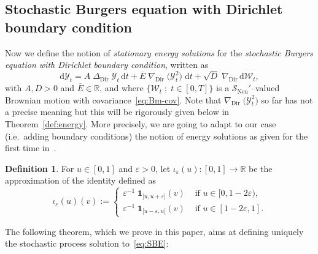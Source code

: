 \documentclass[10pt]{amsart}
\theoremstyle{definition}\newtheorem{defi}[theo]{Definition}\newtheorem{rema}[theo]{Remark}\newtheorem{exam}[theo]{Example}\newtheorem{exem}[theo]{Example}\newtheorem{nota}[theo]{Notation}
\DeclareMathOperator{\Dir}{Dir}
\DeclareMathOperator{\Neu}{Neu}
\newcommand{\bb}[1]{{\mathbb #1}}
\newcommand{\mc}[1]{{\mathcal #1}}
\renewcommand{\mc}[1]{{\mathcal #1}}
\newcommand{\SN}{\ensuremath{\mc S_{\Neu}}}
\renewcommand{\bar}{\overline}
\newcommand*{\dd}{\mathrm{d}}
\newcommand*{\dt}{\dd t}
\begin{document}
\subsection{Stochastic Burgers equation with Dirichlet boundary condition} \label{ssec:SBE}
Now we define the notion of \emph{stationary energy solutions} for the \emph{stochastic Burgers equation with Dirichlet boundary condition}, written as
\begin{equation}\label{eq:SBE}
\dd\mathcal Y_t = A \; \Delta_{\Dir}\; \mathcal Y_t\,\dt + \bar E\;\nabla_{\Dir}\; \big(\mathcal{Y}_t^2 \big) \;\dt + \sqrt{D}\; \nabla_{\Dir}\,\dd\mc W_t,
\end{equation}
with $A,D > 0$ and $\bar E \in \bb R$, and where $\{\mc W_t\; ; \; t\in[0,T]\}$ is a $\SN'$--valued Brownian motion with covariance~\eqref{eq:Bm-cov}. Note that $\nabla_{\Dir}\; \big(\mathcal{Y}_t^2 \big)$ so far has not a precise meaning but this will be rigorously given below in Theorem~\ref{def:energy}. More precisely, we are going to adapt to our case (i.e.~adding boundary conditions) the notion of energy solutions as given for the first time in~\cite{gj2014, Gubinelli2013}.

\begin{defi}\label{def:approx}
For $u\in[0,1]$ and $\varepsilon>0$, let $\iota_\varepsilon(u): [0,1]\to \bb R$ be the approximation of the identity defined as
\[
\iota_\varepsilon(u)(v):=
\begin{cases} \varepsilon^{-1} \; \mathbf{1}_{]u,u+\varepsilon]}(v) & \text{ if } u \in [0, 1 - 2
\varepsilon), \\
\varepsilon^{-1}\; \mathbf{1}_{[u-\varepsilon,u[}(v) & \text{ if } u \in [1 - 2
\varepsilon, 1].
\end{cases}
\]
\end{defi}

The following theorem, which we prove in this paper, aims at defining uniquely the stochastic process solution to~\eqref{eq:SBE}:
\end{document}

